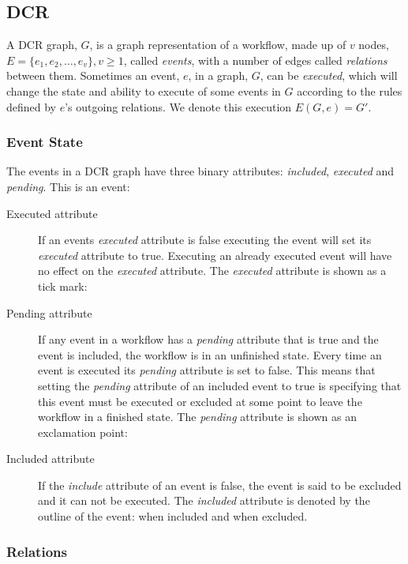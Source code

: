 \documentclass{article}
\begin{document}
	\subsection{DCR}
	\label{subsec:dcr}

	A DCR graph, $G$, is a graph representation of a workflow, made up of $v$ nodes, $E=\{e_1, e_2, \dots, e_v\}, v \geq 1$,  called \textit{events}, with a number of edges called \textit{relations} between them.
	Sometimes an event, $e$, in a graph, $G$, can be \textit{executed}, which will change the state and ability to execute of some events in $G$ according to the rules defined by $e$'s outgoing relations.
	We denote this execution $E(G,e)=G'$.

			\subsubsection{Event State}

			The events in a DCR graph have three binary attributes: \textit{included}, \textit{executed} and \textit{pending}.
			This is an event: 

			\begin{description}
				\item[Executed attribute] If an events \textit{executed} attribute is false executing the event will set its \textit{executed} attribute to true.
				Executing an already executed event will have no effect on the \textit{executed} attribute.
				The \textit{executed} attribute is shown as a tick mark: 
				\item[Pending attribute] If any event in a workflow has a \textit{pending} attribute that is true and the event is included, the workflow is in an unfinished state.
				Every time an event is executed its \textit{pending} attribute is set to false.
				This means that setting the \textit{pending} attribute of an included event to true is specifying that this event must be executed or excluded at some point to leave the workflow in a finished state.
				The \textit{pending} attribute is shown as an exclamation point: 
				\item[Included attribute] If the \textit{include} attribute of an event is false, the event is said to be excluded and it can not be executed.
				The \textit{included} attribute is denoted by the outline of the event:  when included and  when excluded.
			\end{description}

			\subsubsection{Relations}
			\label{subsubsec:relations}
\end{document}
